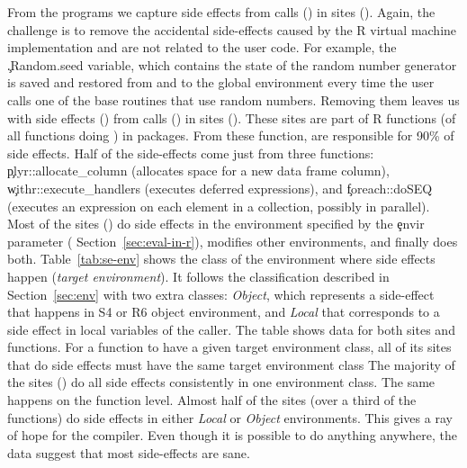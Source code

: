 \documentclass[review,screen,acmsmall,anonymous=true]{acmart}
\begin{document}
From the \packageNbrunsRnd programs we capture \SEAllRnd side effects from
\SEAllCallsRnd \eval calls (\SEUserCallsToAllRatio) in \SEAllSites sites
(\SEUserSitesToAllRatio). Again, the challenge is to remove the accidental
side-effects caused by the R virtual machine implementation and are not
related to the user code. For example, the \c{.Random.seed} variable, which
contains the state of the random number generator is saved and restored from
and to the global environment every time the user calls one of the base
routines that use random numbers.
%
%
Removing them leaves us with \SEUserRnd side effects (\SEUserRatio) from
\SEUserCallsRnd \eval calls (\SEUserCallsRatio) in \SEUserSites sites
(\SEUserSitesRatio). These sites are part of \SEUserFunctions R functions
(\SEUserFunctionsToAllRatio of all functions doing \eval) in \SEUserPackages
packages. From these function, \SEFunsNighty are responsible for 90\% of side
effects. Half of the side-effects come just from three functions:
\c{plyr::allocate\_column} (allocates space for a new data frame column),
\c{withr::execute\_handlers} (executes deferred expressions), and
\c{foreach::doSEQ} (executes an expression on each element in a collection,
possibly in parallel). Most of the \eval sites (\SESitesInEnvirRatio) do side
effects in the environment specified by the \c{envir} parameter (\cf
Section~\ref{sec:eval-in-r}), \SESitesNotInEnvirRatio modifies other
environments, and finally \SESitesBothEnvirRatio does both.
Table~\ref{tab:se-env} shows the class of the environment where \eval side
effects happen (\emph{target environment}). It follows the classification
described in Section~\ref{sec:env} with two extra classes: \emph{Object},
which represents a side-effect that happens in S4 or R6 object environment, and
\emph{Local} that corresponds to a side effect in local variables of the \eval
caller. The table shows data for both \eval sites and functions. For a
function to have a given target environment class, all of its \eval sites that
do side effects must have the same target environment class The majority of the
\eval sites (\SESitesInOneClass) do all side effects consistently in one
environment class. The same happens on the function level. Almost half of the
sites (over a third of the functions) do side effects in either \emph{Local} or
\emph{Object} environments. This gives a ray of hope for the compiler. Even
though it is possible to do anything anywhere, the data suggest that most
side-effects are sane.
\end{document}
